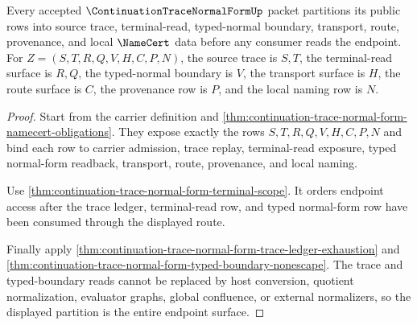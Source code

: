 \begin{theorem}
\label{thm:continuation-trace-normal-form-source-endpoint-partition}
Every accepted $\ContinuationTraceNormalFormUp$ packet partitions its public rows into source trace, terminal-read, typed-normal boundary, transport, route, provenance, and local $\NameCert$ data before any consumer reads the endpoint. For $Z=(S,T,R,Q,V,H,C,P,N)$, the source trace is $S,T$, the terminal-read surface is $R,Q$, the typed-normal boundary is $V$, the transport surface is $H$, the route surface is $C$, the provenance row is $P$, and the local naming row is $N$.
\end{theorem}
\begin{proof}
Start from the carrier definition and \autoref{thm:continuation-trace-normal-form-namecert-obligations}. They expose exactly the rows $S,T,R,Q,V,H,C,P,N$ and bind each row to carrier admission, trace replay, terminal-read exposure, typed normal-form readback, transport, route, provenance, and local naming.

Use \autoref{thm:continuation-trace-normal-form-terminal-scope}. It orders endpoint access after the trace ledger, terminal-read row, and typed normal-form row have been consumed through the displayed route.

Finally apply \autoref{thm:continuation-trace-normal-form-trace-ledger-exhaustion} and \autoref{thm:continuation-trace-normal-form-typed-boundary-nonescape}. The trace and typed-boundary reads cannot be replaced by host conversion, quotient normalization, evaluator graphs, global confluence, or external normalizers, so the displayed partition is the entire endpoint surface.
\end{proof}

